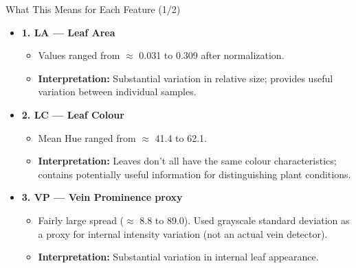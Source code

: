 \documentclass[aspectratio=169, 11pt]{beamer}
\begin{document}
\begin{frame}{What This Means for Each Feature (1/2)}
    \footnotesize
    \begin{itemize}
        \item \textbf{1. LA --- Leaf Area}
        \begin{itemize}\scriptsize
            \item Values ranged from $\approx$ 0.031 to 0.309 after normalization.
            \item \textbf{Interpretation:} Substantial variation in relative size; provides useful variation between individual samples.
        \end{itemize}
        \vspace{0.25cm}
        
        \item \textbf{2. LC --- Leaf Colour}
        \begin{itemize}\scriptsize
            \item Mean Hue ranged from $\approx$ 41.4 to 62.1.
            \item \textbf{Interpretation:} Leaves don't all have the same colour characteristics; contains potentially useful information for distinguishing plant conditions.
        \end{itemize}
        \vspace{0.25cm}
        
        \item \textbf{3. VP --- Vein Prominence proxy}
        \begin{itemize}\scriptsize
            \item Fairly large spread ($\approx$ 8.8 to 89.0). Used grayscale standard deviation as a proxy for internal intensity variation (not an actual vein detector).
            \item \textbf{Interpretation:} Substantial variation in internal leaf appearance.
        \end{itemize}
    \end{itemize}
\end{frame}
\end{document}
